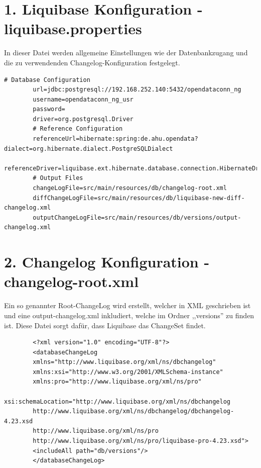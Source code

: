 \documentclass[a4paper,12pt]{scrreprt}
\begin{document}
	\section*{\small \textbf{1. Liquibase Konfiguration - liquibase.properties}}
	In dieser Datei werden allgemeine Einstellungen wie der Datenbankzugang und die zu verwendenden Changelog-Konfiguration festgelegt.
	\begin{lstlisting}[language=properties]
		# Database Configuration
		url=jdbc:postgresql://192.168.252.140:5432/opendataconn_ng
		username=opendataconn_ng_usr
		password=
		driver=org.postgresql.Driver
		# Reference Configuration
		referenceUrl=hibernate:spring:de.ahu.opendata?dialect=org.hibernate.dialect.PostgreSQLDialect
		referenceDriver=liquibase.ext.hibernate.database.connection.HibernateDriver
		# Output Files
		changeLogFile=src/main/resources/db/changelog-root.xml
		diffChangeLogFile=src/main/resources/db/liquibase-new-diff-changelog.xml
		outputChangeLogFile=src/main/resources/db/versions/output-changelog.xml
	\end{lstlisting}
	\section*{\small \textbf{2. Changelog Konfiguration - changelog-root.xml}}
	Ein so genannter Root-ChangeLog wird erstellt, welcher in XML geschrieben ist und eine output-changelog.xml inkludiert, welche im Ordner ,,versions'' zu finden ist. Diese Datei sorgt dafür, dass Liquibase das ChangeSet findet.
	\begin{lstlisting}
		<?xml version="1.0" encoding="UTF-8"?>   
		<databaseChangeLog
		xmlns="http://www.liquibase.org/xml/ns/dbchangelog"
		xmlns:xsi="http://www.w3.org/2001/XMLSchema-instance"
		xmlns:pro="http://www.liquibase.org/xml/ns/pro"
		xsi:schemaLocation="http://www.liquibase.org/xml/ns/dbchangelog
		http://www.liquibase.org/xml/ns/dbchangelog/dbchangelog-4.23.xsd
		http://www.liquibase.org/xml/ns/pro 
		http://www.liquibase.org/xml/ns/pro/liquibase-pro-4.23.xsd">  
		<includeAll path="db/versions"/>  
		</databaseChangeLog>
	\end{lstlisting}
\end{document}
